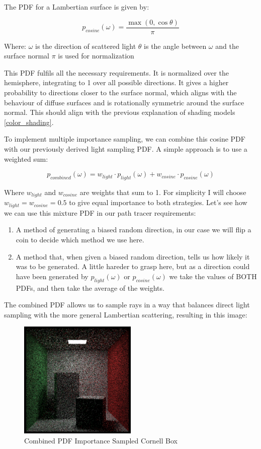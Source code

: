 \documentclass[12pt]{article}
\begin{document}
The PDF for a Lambertian surface is given by:

$$p_{cosine}(\omega) = \frac{\max(0, \cos\theta)}{\pi}$$

Where:
$\omega$ is the direction of scattered light
$\theta$ is the angle between $\omega$ and the surface normal
$\pi$ is used for normalization

This PDF fulfils all the necessary requirements. It is normalized over the hemisphere, integrating to 1 over all possible directions. It gives a higher probability to directions closer to the surface normal, which aligns with the behaviour of diffuse surfaces and is rotationally symmetric around the surface normal. This should align with the previous explanation of shading models \ref{color_shading}.

To implement multiple importance sampling, we can combine this cosine PDF with our previously derived light sampling PDF. A simple approach is to use a weighted sum:

$$p_{combined}(\omega) = w_{light} \cdot p_{light}(\omega) + w_{cosine} \cdot p_{cosine}(\omega)$$

Where $w_{light}$ and $w_{cosine}$ are weights that sum to 1. For simplicity I will choose $w_{light} = w_{cosine} = 0.5$ to give equal importance to both strategies. Let's see how we can use this mixture PDF in our path tracer requirements:

\begin{enumerate}
    \item A method of generating a biased random direction, in our case we will flip a coin to decide which method we use here.
    \item A method that, when given a biased random direction, tells us how likely it was to be generated. A little hareder to grasp here, but as a direction could have been generated by $p_{light}(\omega)$ or $p_{cosine}(\omega)$ we take the values of BOTH PDFs, and then take the average of the weights.
\end{enumerate}


The combined PDF allows us to sample rays in a way that balances direct light sampling with the more general Lambertian scattering, resulting in this image:

\begin{figure}[H]
    \centering
    \includegraphics[width=0.5\textwidth]{images/one_samp/combined_pdf.png}
    \caption{Combined PDF Importance Sampled Cornell Box}
    \label{fig:combinedPDFimportancesampled}
\end{figure}
\end{document}

